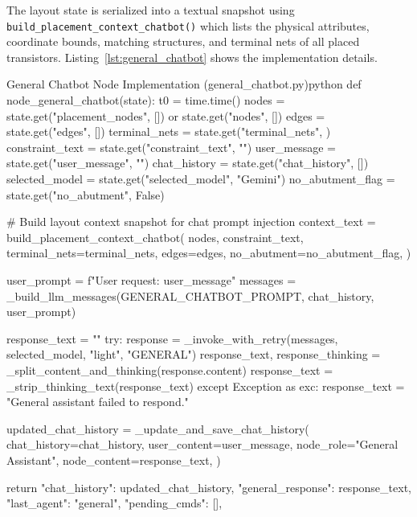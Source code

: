 The layout state is serialized into a textual snapshot using \texttt{build\_}\allowbreak\texttt{placement\_}\allowbreak\texttt{context\_}\allowbreak\texttt{chatbot()} which lists the physical attributes, coordinate bounds, matching structures, and terminal nets of all placed transistors. Listing~\ref{lst:general_chatbot} shows the implementation details.

\begin{thesiscode}{General Chatbot Node Implementation (general\_chatbot.py)\label{lst:general_chatbot}}{python}
def node_general_chatbot(state):
    t0 = time.time()
    nodes = state.get("placement_nodes", []) or state.get("nodes", [])
    edges = state.get("edges", [])
    terminal_nets = state.get("terminal_nets", {})
    constraint_text = state.get("constraint_text", "")
    user_message = state.get("user_message", "")
    chat_history = state.get("chat_history", [])
    selected_model = state.get("selected_model", "Gemini")
    no_abutment_flag = state.get("no_abutment", False)

    # Build layout context snapshot for chat prompt injection
    context_text = build_placement_context_chatbot(
        nodes, constraint_text, terminal_nets=terminal_nets,
        edges=edges, no_abutment=no_abutment_flag,
    )

    user_prompt = f"User request: {user_message}\n{}"
    messages = _build_llm_messages(GENERAL_CHATBOT_PROMPT, chat_history, user_prompt)
    
    response_text = ""
    try:
        response = _invoke_with_retry(messages, selected_model, "light", "GENERAL")
        response_text, response_thinking = _split_content_and_thinking(response.content)
        response_text = _strip_thinking_text(response_text)
    except Exception as exc:
        response_text = "General assistant failed to respond."

    updated_chat_history = _update_and_save_chat_history(
        chat_history=chat_history, user_content=user_message,
        node_role="General Assistant", node_content=response_text,
    )

    return {
        "chat_history": updated_chat_history,
        "general_response": response_text,
        "last_agent": "general",
        "pending_cmds": [],
    }
\end{thesiscode}

